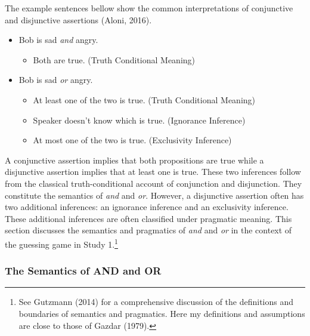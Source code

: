 \documentclass[oneside]{report}
\theoremstyle{definition}
\theoremstyle{definition}
\theoremstyle{definition}
\theoremstyle{remark}
\begin{document}
The example sentences bellow show the common interpretations of
conjunctive and disjunctive assertions (Aloni, 2016).
\begin{itemize}
\tightlist
\item
  Bob is sad \emph{and} angry.
  \begin{itemize}
  \tightlist
  \item
    Both are true. (Truth Conditional Meaning)
  \end{itemize}
\item
  Bob is sad \emph{or} angry.
  \begin{itemize}
  \tightlist
  \item
    At least one of the two is true. (Truth Conditional Meaning)
  \item
    Speaker doesn't know which is true. (Ignorance Inference)
  \item
    At most one of the two is true. (Exclusivity Inference)
  \end{itemize}
\end{itemize}
A conjunctive assertion implies that both propositions are true while a
disjunctive assertion implies that at least one is true. These two
inferences follow from the classical truth-conditional account of
conjunction and disjunction. They constitute the semantics of \emph{and}
and \emph{or}. However, a disjunctive assertion often has two additional
inferences: an ignorance inference and an exclusivity inference. These
additional inferences are often classified under pragmatic meaning. This
section discusses the semantics and pragmatics of \emph{and} and
\emph{or} in the context of the guessing game in Study 1.\footnote{See
  Gutzmann (2014) for a comprehensive discussion of the definitions and
  boundaries of semantics and pragmatics. Here my definitions and
  assumptions are close to those of Gazdar (1979).}

\subsubsection{The Semantics of AND and
OR}\label{the-semantics-of-and-and-or}
\end{document}
